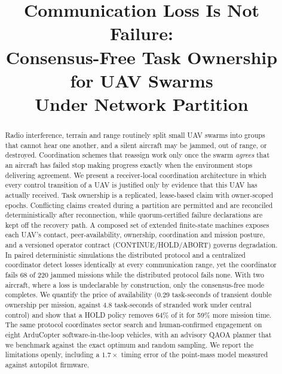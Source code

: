 \documentclass[conference]{IEEEtran}
\newcommand{\stt}[1]{\textsf{#1}}     %
\begin{document}
\title{Communication Loss Is Not Failure:\\
Consensus-Free Task Ownership for UAV Swarms\\ Under Network Partition}

\author{
}

\maketitle

\begin{abstract}
Radio interference, terrain and range routinely split small UAV swarms into
groups that cannot hear one another, and a silent aircraft may be jammed, out
of range, or destroyed. Coordination schemes that reassign work only once the
swarm \emph{agrees} that an aircraft has failed stop making progress exactly
when the environment stops delivering agreement. We present a receiver-local
coordination architecture in which every control transition of a UAV is
justified only by evidence that this UAV has actually received. Task
ownership is a replicated, lease-based claim with owner-scoped epochs.
Conflicting claims created during a partition are permitted and are
reconciled deterministically after reconnection, while quorum-certified
failure declarations are kept off the recovery path. A composed set of
extended finite-state machines exposes each UAV's contact, peer-availability,
ownership, coordination and mission posture, and a versioned operator
contract (\stt{CONTINUE}/\stt{HOLD}/\stt{ABORT}) governs degradation. In
paired deterministic simulations the distributed protocol and a centralized
coordinator detect losses identically at every communication range, yet the
coordinator fails 68 of 220 jammed missions while the distributed protocol
fails none. With two aircraft, where a loss is undeclarable by construction,
only the consensus-free mode completes. We quantify the price of availability
(0.29 task-seconds of transient double ownership per mission, against
4.8 task-seconds of stranded work under central control) and show that a
\stt{HOLD} policy removes 64\% of it for 59\% more mission time. The same
protocol coordinates sector search and human-confirmed engagement on eight
ArduCopter software-in-the-loop vehicles, with an advisory QAOA planner that
we benchmark against the exact optimum and random sampling. We report the
limitations openly, including a $1.7\times$ timing error of the point-mass
model measured against autopilot firmware.
\end{abstract}
\end{document}

